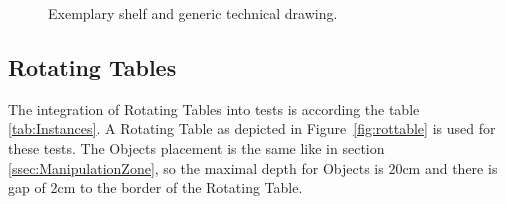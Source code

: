 \begin{figure}[h!]
	\centering
	\hspace{0.05\textwidth}
	\caption{Exemplary shelf and generic technical drawing.}%
	\label{fig:shelf}
\end{figure}


\subsection{Rotating Tables}\label{sec:Rotating Table}
The integration of Rotating Tables into tests is according the table \ref{tab:Instances}.  A Rotating Table as depicted in Figure~\ref{fig:rottable} is used for these tests. The Objects placement is the same like in section \ref{ssec:ManipulationZone}, so the maximal depth for Objects is $20 \si{\centi\meter}$ and there is gap of $2\si{\centi\meter}$ to the border of the Rotating Table.


